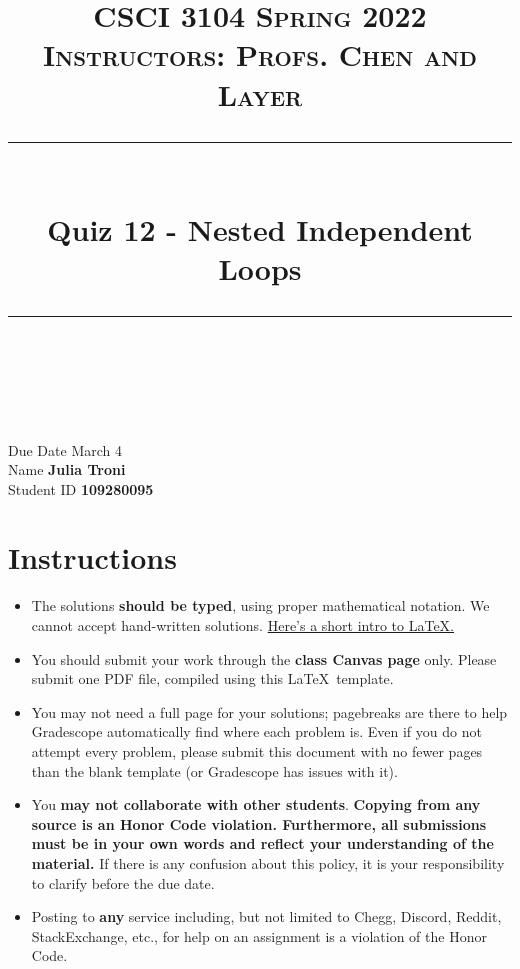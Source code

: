 \documentclass[11pt]{article}
\title{
\normalfont \normalsize 
\textsc{CSCI 3104 Spring 2022 \\ 
Instructors: Profs. Chen and Layer} \\
[10pt] 
\rule{\linewidth}{0.5pt} \\[6pt] 
\huge Quiz 12 -  Nested Independent Loops \\
\rule{\linewidth}{2pt}  \\[10pt]
}
\date{}
\theoremstyle{definition}
\theoremstyle{definition}
\theoremstyle{definition}
\begin{document}

\maketitle


\noindent
Due Date \dotfill March 4 \\
Name \dotfill \textbf{Julia Troni} \\
Student ID \dotfill \textbf{109280095} \\



\tableofcontents

\section{Instructions}
 \begin{itemize}
	\item The solutions \textbf{should be typed}, using proper mathematical notation. We cannot accept hand-written solutions. \href{http://ece.uprm.edu/~caceros/latex/introduction.pdf}{Here's a short intro to \LaTeX.}
	\item You should submit your work through the \textbf{class Canvas page} only. Please submit one PDF file, compiled using this \LaTeX \ template.
	\item You may not need a full page for your solutions; pagebreaks are there to help Gradescope automatically find where each problem is. Even if you do not attempt every problem, please submit this document with no fewer pages than the blank template (or Gradescope has issues with it).

	\item You \textbf{may not collaborate with other students}. \textbf{Copying from any source is an Honor Code violation. Furthermore, all submissions must be in your own words and reflect your understanding of the material.} If there is any confusion about this policy, it is your responsibility to clarify before the due date. 

	\item Posting to \textbf{any} service including, but not limited to Chegg, Discord, Reddit, StackExchange, etc., for help on an assignment is a violation of the Honor Code.
\end{itemize}
\end{document}
